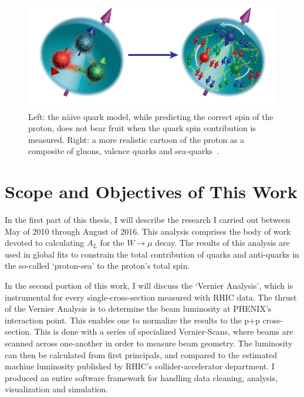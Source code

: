 \begin{figure}
  \centering
  \includegraphics[width=0.8\linewidth]{./figures/figures_introduction_nucleon_picture.png}
  \caption{
    Left: the n{\"a}ive quark model, while predicting the correct spin of the
    proton, does not bear fruit when the quark spin contribution is measured.
    Right: a more realistic cartoon of the proton as a composite of gluons,
    valence quarks and sea-quarks~\cite{Accardi2012}.
  }
  \label{fig:spin_crisis_cartoon}
\end{figure}
 
\section{Scope and Objectives of This Work} 

In the first part of this thesis, I will describe the research I carried out
between May of 2010 through August of 2016.  This analysis comprises the body of
work devoted to calculating $A_L$ for the $W\rightarrow\mu$ decay. The results
of this analysis are used in global fits to constrain the total contribution of
quarks and anti-quarks in the so-called `proton-sea' to the proton's total spin.

In the second portion of this work, I will discuss the `Vernier Analysis', which
is instrumental for every single-cross-section measured with RHIC data.
The thrust of the Vernier Analysis is to determine the beam luminosity at
PHENIX's interaction point. This enables one to normalize the results to the p+p
cross-section. This is done with a series of specialized Vernier-Scans, where
beams are scanned across one-another in order to measure beam geometry. The
luminosity can then be calculated from first principals, and compared to the
estimated machine luminosity published by RHIC's collider-accelerator
department. I produced an entire software framework for handling data cleaning,
analysis, visualization and simulation.

